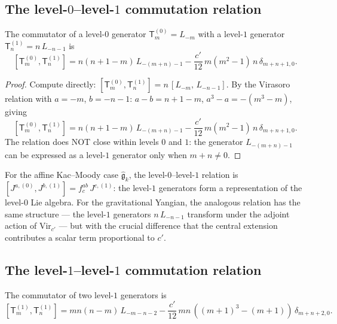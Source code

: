 \documentclass[11pt]{article}
\newcommand{\fg}{\mathfrak{g}}
\begin{document}
\subsection{The level-$0$--level-$1$ commutation relation}

\begin{proposition}
\label{prop:gy-01-bracket}
The commutator of a level-$0$ generator $\mathsf{T}_m^{(0)} = L_{-m}$
with a level-$1$ generator $\mathsf{T}_n^{(1)} = n\,L_{-n-1}$ is
\begin{equation}\label{eq:gy-01-comm}
\boxed{
[\mathsf{T}_m^{(0)}, \mathsf{T}_n^{(1)}]
= n(n+1-m)\,L_{-(m+n)-1}
  - \frac{c'}{12}\,m(m^2-1)\,n\,\delta_{m+n+1,0}.
}
\end{equation}
\end{proposition}

\begin{proof}
Compute directly:
$[\mathsf{T}_m^{(0)}, \mathsf{T}_n^{(1)}]
= n\,[L_{-m},\,L_{-n-1}]$.
By the Virasoro relation with $a = -m$, $b = -n-1$:
$a - b = n+1-m$, $a^3 - a = -(m^3-m)$, giving
\[
[\mathsf{T}_m^{(0)}, \mathsf{T}_n^{(1)}]
= n(n+1-m)\,L_{-(m+n)-1}
  - \frac{c'}{12}\,m(m^2-1)\,n\,\delta_{m+n+1,0}.
\]
The relation does NOT close within levels $0$ and $1$: the generator
$L_{-(m+n)-1}$ can be expressed as a level-$1$ generator only when
$m+n \ne 0$.
\end{proof}

\begin{remark}
For the affine Kac--Moody case $\widehat{\fg}_k$, the
level-$0$--level-$1$ relation is
$[J^{a,(0)}, J^{b,(1)}] = f^{ab}_c\,J^{c,(1)}$:
the level-$1$ generators form a representation of the level-$0$ Lie
algebra.  For the gravitational Yangian, the analogous relation
has the same structure --- the level-$1$ generators $n\,L_{-n-1}$
transform under the adjoint action of $\mathrm{Vir}_{c'}$ --- but
with the crucial difference that the central extension contributes
a scalar term proportional to $c'$.
\end{remark}


\subsection{The level-$1$--level-$1$ commutation relation}

\begin{theorem}
\label{thm:gy-11-bracket}
The commutator of two level-$1$ generators is
\begin{equation}\label{eq:gy-11-comm}
\boxed{
[\mathsf{T}_m^{(1)}, \mathsf{T}_n^{(1)}]
= mn(n-m)\,L_{-m-n-2}
  - \frac{c'}{12}\,mn\,((m+1)^3 - (m+1))\,\delta_{m+n+2,0}.
}
\end{equation}
\end{theorem}
\end{document}
